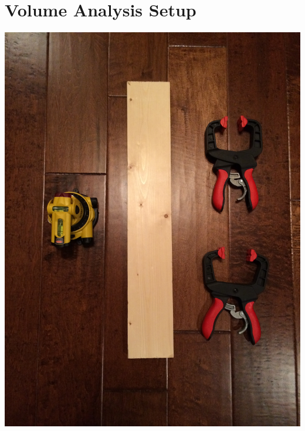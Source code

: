 \documentclass[12pt]{article}
\begin{document}
\section{Volume Analysis Setup}
\includegraphics[scale=0.1,angle=270]{images/volume_analysis_setup/IMG_0618.JPG}
\newpage
\end{document}
